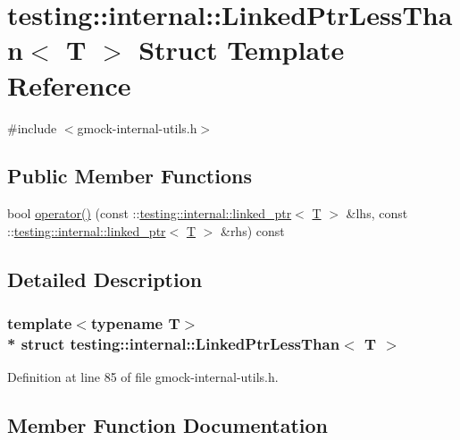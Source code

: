 \hypertarget{structtesting_1_1internal_1_1_linked_ptr_less_than}{}\section{testing\+:\+:internal\+:\+:Linked\+Ptr\+Less\+Than$<$ T $>$ Struct Template Reference}
\label{structtesting_1_1internal_1_1_linked_ptr_less_than}


{\ttfamily \#include $<$gmock-\/internal-\/utils.\+h$>$}

\subsection*{Public Member Functions}
\begin{DoxyCompactItemize}
\item 
bool \hyperlink{structtesting_1_1internal_1_1_linked_ptr_less_than_a713e1946ab10eb409e215dbb36fcf5ae}{operator()} (const \+::\hyperlink{classtesting_1_1internal_1_1linked__ptr}{testing\+::internal\+::linked\+\_\+ptr}$<$ \hyperlink{functions__7_8js_adf1f3edb9115acb0a1e04209b7a9937b}{T} $>$ \&lhs, const \+::\hyperlink{classtesting_1_1internal_1_1linked__ptr}{testing\+::internal\+::linked\+\_\+ptr}$<$ \hyperlink{functions__7_8js_adf1f3edb9115acb0a1e04209b7a9937b}{T} $>$ \&rhs) const 
\end{DoxyCompactItemize}


\subsection{Detailed Description}
\subsubsection*{template$<$typename T$>$\\*
struct testing\+::internal\+::\+Linked\+Ptr\+Less\+Than$<$ T $>$}



Definition at line 85 of file gmock-\/internal-\/utils.\+h.



\subsection{Member Function Documentation}
